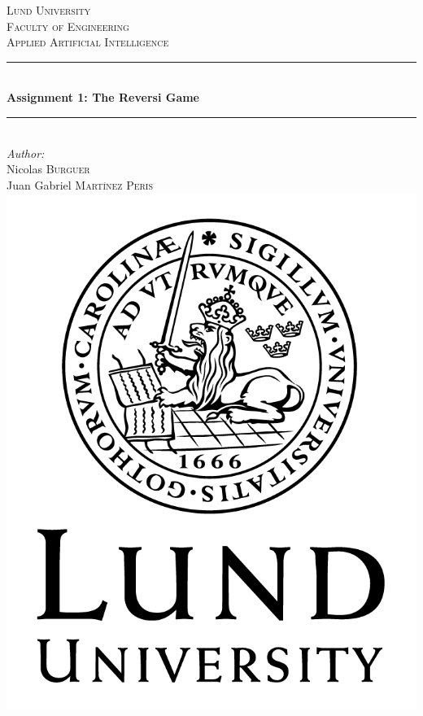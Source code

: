 \documentclass[12pt]{article}
\begin{document}
\begin{titlepage}

\newcommand{\HRule}{\rule{\linewidth}{0.5mm}}

\center
 
\textsc{\LARGE Lund University}\\[1.5cm]
\textsc{\Large Faculty of Engineering}\\[0.5cm]
\textsc{\large Applied Artificial Intelligence}\\[0.5cm]

\HRule \\[0.4cm]
{ \Large \bfseries Assignment 1: The Reversi Game}\\[0.1cm]
\HRule \\[1.5cm]
 
\Large \emph{Author:}\\
Nicolas \textsc{Burguer}\\
Juan Gabriel \textsc{Mart\'{i}nez Peris}\\[3cm]

\includegraphics[scale=0.35]{logo.png}\\[1cm] %

\vfill %

\end{titlepage}
\tableofcontents
\newpage
\end{document}
